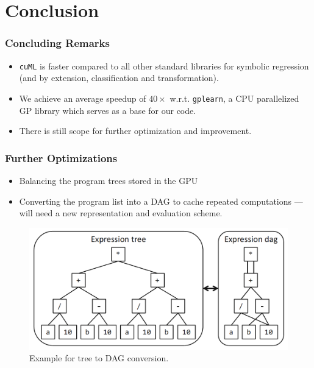 \documentclass{beamer}
\begin{document}
\section{Conclusion}
\begin{frame}
  \frametitle{Concluding Remarks}
  \begin{itemize}
    \item \texttt{cuML} is faster compared to all other standard libraries for symbolic regression (and by extension, classification and transformation).
    \item We achieve an average speedup of $40\times$ w.r.t. \texttt{gplearn}, a CPU parallelized GP library which serves as a base for our code.
    \item There is still scope for further optimization and improvement.
  \end{itemize}
\end{frame}

\begin{frame}
  \frametitle{Further Optimizations}
  \begin{itemize}
    \item Balancing the program trees stored in the GPU
    \item Converting the program list into a DAG to cache repeated computations --- will need a new representation and evaluation scheme.
  \end{itemize}
  \begin{figure}
    \centering
    \includegraphics[scale=0.22]{images/dag.png}
    \caption{Example for tree to DAG conversion\footnotemark.}
  \end{figure}
\end{frame}
\end{document}
